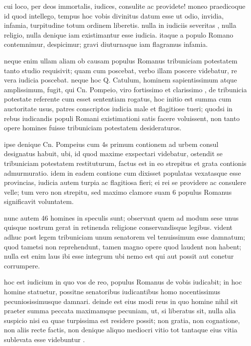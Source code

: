  cui loco, per deos immortalis, iudices, consulite ac providete! moneo praedicoque id quod intellego, tempus hoc vobis divinitus datum esse ut odio, invidia, infamia, turpitudine totum ordinem liberetis. nulla in iudiciis severitas , nulla religio, nulla denique iam existimantur esse iudicia. itaque a populo Romano contemnimur, despicimur; gravi diuturnaque iam flagramus infamia.

 neque enim ullam aliam ob causam populus Romanus tribuniciam potestatem tanto studio requisivit; quam cum poscebat, verbo illam poscere videbatur, re vera iudicia poscebat. neque hoc Q. Catulum, hominem sapientissimum atque amplissimum, fugit, qui Cn. Pompeio, viro fortissimo et clarissimo , de tribunicia potestate referente cum esset sententiam rogatus, hoc initio est summa cum auctoritate usus, patres conscriptos iudicia male et flagitiose tueri; quodsi in rebus iudicandis populi Romani existimationi satis facere voluissent, non tanto opere homines fuisse tribuniciam potestatem desideraturos.

 ipse denique Cn. Pompeius cum 4s primum contionem ad urbem consul designatus habuit, ubi, id quod maxime exspectari videbatur, ostendit se tribuniciam potestatem restituturum, factus est in eo strepitus et grata contionis admurmuratio. idem in eadem contione cum dixisset populatas vexatasque esse provincias, iudicia autem turpia ac flagitiosa fieri; ei rei se providere ac consulere velle; tum vero non strepitu, sed maximo clamore suam 6 populus Romanus significavit voluntatem.

 nunc autem 46 homines in speculis sunt; observant quem ad modum sese unus quisque nostrum gerat in retinenda religione conservandisque legibus. vident adhuc post legem tribuniciam unum senatorem vel tenuissimum esse damnatum; quod tametsi non reprehendunt, tamen magno opere quod laudent non habent; nulla est enim laus ibi esse integrum ubi nemo est qui aut possit aut conetur corrumpere.

 hoc est iudicium in quo vos de reo, populus Romanus de vobis iudicabit; in hoc homine statuetur, possitne senatoribus iudicantibus homo nocentissimus pecuniosissimusque damnari. deinde est eius modi reus in quo homine nihil sit praeter summa peccata maximamque pecuniam, ut, si liberatus sit, nulla alia suspicio nisi ea quae turpissima est residere possit; non gratia, non cognatione, non aliis recte factis, non denique aliquo mediocri vitio tot tantaque eius vitia sublevata esse videbuntur .

